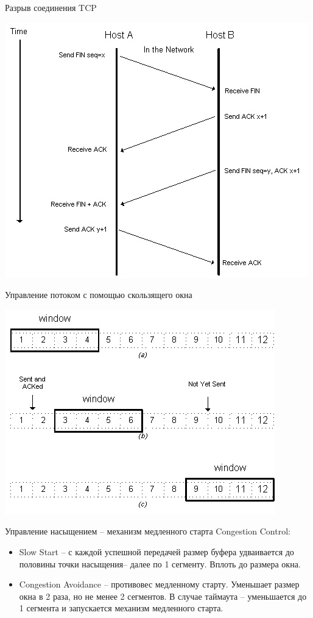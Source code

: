 \begin{frame}{Разрыв соединения TCP}
	\begin{center}
		\includegraphics[height=0.7\textheight]{04-tcp-connection-termination.png}
	\end{center}
\end{frame}

\begin{frame}{Управление потоком с помощью скользящего окна}
	\begin{center}
		\includegraphics[height=0.7\textheight]{04-sliding-window.png}
	\end{center}
\end{frame}

\begin{frame}{Управление насыщением -- механизм медленного старта}
	Congestion Control:
	\begin{itemize}
		\item Slow Start -- с каждой успешной передачей размер буфера удваивается до половины точки насыщения-- далее по 1 сегменту. Вплоть до размера окна.
		\item Congestion Avoidance -- противовес медленному старту. Уменьшает размер окна в 2 раза,  но не менее 2 сегментов. В случае таймаута -- уменьшается до 1 сегмента и запускается механизм медленного старта.
	\end{itemize}
\end{frame}

